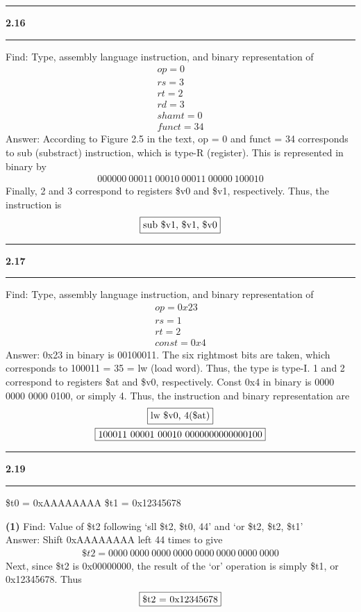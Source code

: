 \documentclass[11pt]{article}
\newcommand\question[2]{\vspace{.25in}\hrule\textbf{#1 #2}\vspace{.5em}\hrule\vspace{.10in}}
\renewcommand\part[1]{\vspace{.10in}\textbf{(#1)}}
\begin{document}
\question{2.16}{}
Find: Type, assembly language instruction, and binary representation of 
\begin{gather*}
op = 0 \\
rs = 3 \\
rt = 2 \\ 
rd = 3 \\
shamt = 0 \\
funct = 34
\end{gather*}
Answer: According to Figure 2.5 in the text, op = 0 and funct = 34 corresponds to sub (substract) instruction, which is type-R (register). This is represented in binary by
\begin{gather*}
000000 \ 00011 \ 00010 \ 00011 \ 00000 \ 100010
\end{gather*}
Finally, 2 and 3 correspond to registers \$v0 and \$v1, respectively. Thus, the instruction is
\begin{gather*}
\fbox{sub \$v1, \$v1, \$v0}
\end{gather*}

\question{2.17}{} 
Find: Type, assembly language instruction, and binary representation of 
\begin{gather*}
op = 0x23 \\
rs = 1 \\
rt = 2 \\ 
const = 0x4
\end{gather*}
Answer: 0x23 in binary is 00100011. The six rightmost bits are taken, which corresponds to 100011 = 35 = lw (load word). Thus, the type is type-I. 1 and 2 correspond to registers \$at and \$v0, respectively. Const 0x4 in binary is 0000 0000 0000 0100, or simply 4. Thus, the instruction and binary representation are
\begin{gather*}
\fbox{lw \$v0, 4(\$at)} \\
\fbox{100011 00001 00010 0000000000000100}
\end{gather*}

\question{2.19}{}
\$t0 = 0xAAAAAAAA \quad \$t1 = 0x12345678

\part{1}
Find: Value of \$t2 following `sll \$t2, \$t0, 44' and `or \$t2, \$t2, \$t1' \\
\vspace{5mm}
Answer: Shift 0xAAAAAAAA left 44 times to give
\begin{gather*}
\$t2 = 0000 \ 0000 \ 0000 \ 0000 \ 0000 \ 0000 \ 0000 \ 0000
\end{gather*}
Next, since \$t2 is 0x00000000, the result of the `or' operation is simply \$t1, or 0x12345678. Thus
\begin{gather*}
\fbox{\$t2 = 0x12345678}
\end{gather*}
\end{document}
